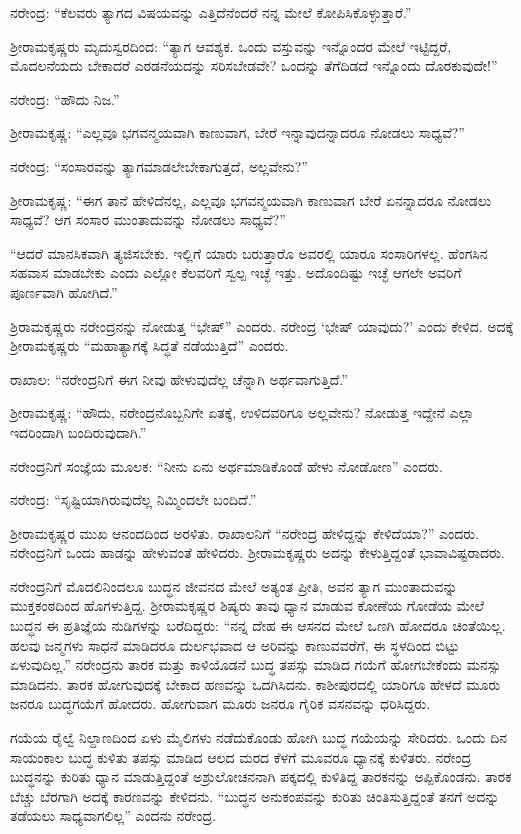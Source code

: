 ನರೇಂದ್ರ: “ಕೆಲವರು ತ್ಯಾಗದ ವಿಷಯವನ್ನು ಎತ್ತಿದೆನೆಂದರೆ ನನ್ನ ಮೇಲೆ ಕೋಪಿಸಿಕೊಳ್ಳುತ್ತಾರೆ.”

ಶ‍್ರೀರಾಮಕೃಷ್ಣರು ಮೃದುಸ್ವರದಿಂದ: “ತ್ಯಾಗ ಆವಶ್ಯಕ. ಒಂದು ವಸ್ತುವನ್ನು ಇನ್ನೊಂದರ ಮೇಲೆ ಇಟ್ಟಿದ್ದರೆ, ಮೊದಲನೆಯದು ಬೇಕಾದರೆ ಎರಡನೆಯದನ್ನು ಸರಿಸಬೇಡವೇ? ಒಂದನ್ನು ತೆಗೆದಿಡದೆ ಇನ್ನೊಂದು ದೊರಕುವುದೇ!”

ನರೇಂದ್ರ: “ಹೌದು ನಿಜ.”

ಶ‍್ರೀರಾಮಕೃಷ್ಣ: “ಎಲ್ಲವೂ ಭಗವನ್ಮಯವಾಗಿ ಕಾಣುವಾಗ, ಬೇರೆ ಇನ್ನಾವುದನ್ನಾದರೂ ನೋಡಲು ಸಾಧ್ಯವೆ?”

ನರೇಂದ್ರ: “ಸಂಸಾರವನ್ನು ತ್ಯಾಗಮಾಡಲೇಬೇಕಾಗುತ್ತದೆ, ಅಲ್ಲವೇನು?”

ಶ‍್ರೀರಾಮಕೃಷ್ಣ: “ಈಗ ತಾನೆ ಹೇಳಿದೆನಲ್ಲ, ಎಲ್ಲವೂ ಭಗವನ್ಮಯವಾಗಿ ಕಾಣುವಾಗ ಬೇರೆ ಏನನ್ನಾದರೂ ನೋಡಲು ಸಾಧ್ಯವೆ? ಆಗ ಸಂಸಾರ ಮುಂತಾದುವನ್ನು ನೋಡಲು ಸಾಧ್ಯವೆ?”

“ಆದರೆ ಮಾನಸಿಕವಾಗಿ ತ್ಯಜಿಸಬೇಕು. ಇಲ್ಲಿಗೆ ಯಾರು ಬರುತ್ತಾರೊ ಅವರಲ್ಲಿ ಯಾರೂ ಸಂಸಾರಿಗಳಲ್ಲ. ಹೆಂಗಸಿನ ಸಹವಾಸ ಮಾಡಬೇಕು ಎಂದು ಎಲ್ಲೋ ಕೆಲವರಿಗೆ ಸ್ವಲ್ಪ ಇಚ್ಛೆ ಇತ್ತು. ಅದೊಂದಿಷ್ಟು ಇಚ್ಛೆ ಆಗಲೇ ಅವರಿಗೆ ಪೂರ್ಣವಾಗಿ ಹೋಗಿದೆ.”

ಶ್ರಿರಾಮಕೃಷ್ಣರು ನರೇಂದ್ರನನ್ನು ನೋಡುತ್ತ “ಭೇಷ್” ಎಂದರು. ನರೇಂದ್ರ ‘ಭೇಷ್ ಯಾವುದು?’ ಎಂದು ಕೇಳಿದ. ಅದಕ್ಕೆ ಶ‍್ರೀರಾಮಕೃಷ್ಣರು “ಮಹಾತ್ಯಾಗಕ್ಕೆ ಸಿದ್ಧತೆ ನಡೆಯುತ್ತಿದೆ” ಎಂದರು.

ರಾಖಾಲ: “ನರೇಂದ್ರನಿಗೆ ಈಗ ನೀವು ಹೇಳುವುದೆಲ್ಲ ಚೆನ್ನಾಗಿ ಅರ್ಥವಾಗುತ್ತಿದೆ.”

ಶ‍್ರೀರಾಮಕೃಷ್ಣ: “ಹೌದು, ನರೇಂದ್ರನೊಬ್ಬನಿಗೇ ಏತಕ್ಕೆ, ಉಳಿದವರಿಗೂ ಅಲ್ಲವೇನು? ನೋಡುತ್ತ ಇದ್ದೇನೆ ಎಲ್ಲಾ ಇದರಿಂದಾಗಿ ಬಂದಿರುವುದಾಗಿ.”

ನರೇಂದ್ರನಿಗೆ ಸಂಜ್ಞೆಯ ಮೂಲಕ: “ನೀನು ಏನು ಅರ್ಥಮಾಡಿಕೊಂಡೆ ಹೇಳು ನೋಡೋಣ” ಎಂದರು.

ನರೇಂದ್ರ: “ಸೃಷ್ಟಿಯಾಗಿರುವುದೆಲ್ಲ ನಿಮ್ಮಿಂದಲೇ ಬಂದಿದೆ.”

ಶ‍್ರೀರಾಮಕೃಷ್ಣರ ಮುಖ ಆನಂದದಿಂದ ಅರಳಿತು. ರಾಖಾಲನಿಗೆ “ನರೇಂದ್ರ ಹೇಳಿದ್ದನ್ನು ಕೇಳಿದೆಯಾ?” ಎಂದರು. ನರೇಂದ್ರನಿಗೆ ಒಂದು ಹಾಡನ್ನು ಹೇಳುವಂತೆ ಹೇಳಿದರು. ಶ‍್ರೀರಾಮಕೃಷ್ಣರು ಅದನ್ನು ಕೇಳುತ್ತಿದ್ದಂತೆ ಭಾವಾವಿಷ್ಟರಾದರು.

ನರೇಂದ್ರನಿಗೆ ಮೊದಲಿನಿಂದಲೂ ಬುದ್ಧನ ಜೀವನದ ಮೇಲೆ ಅತ್ಯಂತ ಪ್ರೀತಿ, ಅವನ ತ್ಯಾಗ ಮುಂತಾದುವನ್ನು ಮುಕ್ತಕಂಠದಿಂದ ಹೊಗಳುತ್ತಿದ್ದ. ಶ‍್ರೀರಾಮಕೃಷ್ಣರ ಶಿಷ್ಯರು ತಾವು ಧ್ಯಾನ ಮಾಡುವ ಕೋಣೆಯ ಗೋಡೆಯ ಮೇಲೆ ಬುದ್ಧನ ಈ ಪ್ರತಿಜ್ಞೆಯ ನುಡಿಗಳನ್ನು ಬರೆದಿದ್ದರು: “ನನ್ನ ದೇಹ ಈ ಆಸನದ ಮೇಲೆ ಒಣಗಿ ಹೋದರೂ ಚಿಂತೆಯಿಲ್ಲ. ಹಲವು ಜನ್ಮಗಳು ಸಾಧನೆ ಮಾಡಿದರೂ ದುರ್ಲಭವಾದ ಆ ಅರಿವನ್ನು ಕಾಣುವವರೆಗೆ, ಈ ಸ್ಥಳದಿಂದ ಬಿಟ್ಟು ಏಳುವುದಿಲ್ಲ.” ನರೇಂದ್ರನು ತಾರಕ ಮತ್ತು ಕಾಳಿಯೊಡನೆ ಬುದ್ಧ ತಪಸ್ಸು ಮಾಡಿದ ಗಯೆಗೆ ಹೋಗಬೇಕೆಂದು ಮನಸ್ಸು ಮಾಡಿದನು. ತಾರಕ ಹೋಗುವುದಕ್ಕೆ ಬೇಕಾದ ಹಣವನ್ನು ಒದಗಿಸಿದನು. ಕಾಶೀಪುರದಲ್ಲಿ ಯಾರಿಗೂ ಹೇಳದೆ ಮೂರು ಜನರೂ ಬುದ್ಧಗಯೆಗೆ ಹೋದರು. ಹೋಗುವಾಗ ಮೂರು ಜನರೂ ಗೈರಿಕ ವಸನವನ್ನು ಧರಿಸಿದ್ದರು.

ಗಯೆಯ ರೈಲ್ವೆ ನಿಲ್ದಾಣದಿಂದ ಏಳು ಮೈಲಿಗಳು ನಡೆದುಕೊಂಡು ಹೋಗಿ ಬುದ್ಧ ಗಯೆಯನ್ನು ಸೇರಿದರು. ಒಂದು ದಿನ ಸಾಯಂಕಾಲ ಬುದ್ಧ ಕುಳಿತು ತಪಸ್ಸು ಮಾಡಿದ ಆಲದ ಮರದ ಕೆಳಗೆ ಮೂವರೂ ಧ್ಯಾನಕ್ಕೆ ಕುಳಿತರು. ನರೇಂದ್ರ ಬುದ್ಧನನ್ನು ಕುರಿತು ಧ್ಯಾನ ಮಾಡುತ್ತಿದ್ದಂತೆ ಅಶ್ರುಲೋಚನನಾಗಿ ಪಕ್ಕದಲ್ಲಿ ಕುಳಿತಿದ್ದ ತಾರಕನನ್ನು ಅಪ್ಪಿಕೊಂಡನು. ತಾರಕ ಬೆಚ್ಚು ಬೆರಗಾಗಿ ಅದಕ್ಕೆ ಕಾರಣವನ್ನು ಕೇಳಿದನು. “ಬುದ್ಧನ ಅನುಕಂಪವನ್ನು ಕುರಿತು ಚಿಂತಿಸುತ್ತಿದ್ದಂತೆ ತನಗೆ ಅದನ್ನು ತಡೆಯಲು ಸಾಧ್ಯವಾಗಲಿಲ್ಲ” ಎಂದನು ನರೇಂದ್ರ.

